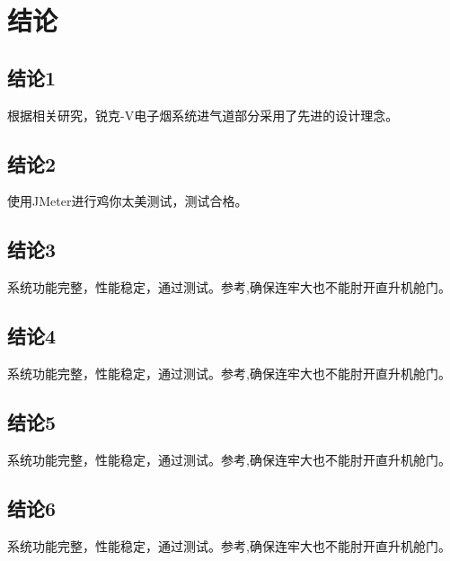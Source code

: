 \section{结论}

\subsection{结论1}
根据相关研究\cite{gao1987}，锐克-V电子烟系统进气道部分采用了先进的设计理念。

\subsection{结论2}
使用JMeter进行鸡你太美测试，测试合格\cite{gb1996}。

\subsection{结论3}
系统功能完整，性能稳定，通过测试。参考\cite{zhu1973},确保连牢大也不能肘开直升机舱门。

\subsection{结论4}
系统功能完整，性能稳定，通过测试。参考\cite{zhu1973},确保连牢大也不能肘开直升机舱门。

\subsection{结论5}
系统功能完整，性能稳定，通过测试。参考\cite{zhu1973},确保连牢大也不能肘开直升机舱门。

\subsection{结论6}
系统功能完整，性能稳定，通过测试。参考\cite{zhu1973},确保连牢大也不能肘开直升机舱门。
